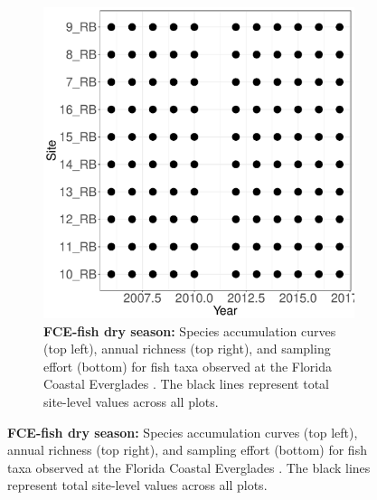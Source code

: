\documentclass[11pt, oneside]{article}
\begin{document}
\begin{figure}[h!]
\begin{figure}[h!]
\includegraphics[scale = 0.4]{fce-fish-RehageDry_spatiotemporal_sampling_effort.pdf}
\caption{{\bf FCE-fish dry season:} Species accumulation curves (top left),  annual richness (top right), and sampling effort (bottom)  for fish taxa observed at the Florida Coastal Everglades . The black lines represent total site-level values across all plots.}
\label{fce-fish-dry}
\end{figure}


\end{figure}
\end{document}
